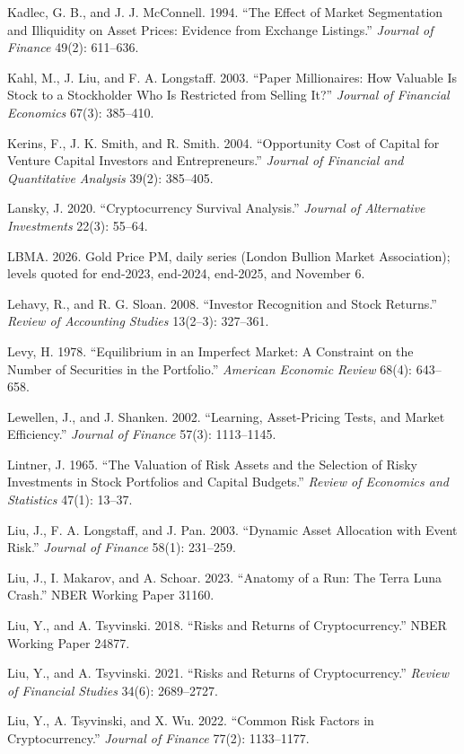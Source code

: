 \documentclass[11pt]{article}
\begin{document}
\begin{list}{}{\setlength{\itemindent}{-1.5em}\setlength{\leftmargin}{1.5em}\setlength{\itemsep}{2pt}\setlength{\parsep}{0pt}}
\item Kadlec, G. B., and J. J. McConnell. 1994. ``The Effect of Market Segmentation and Illiquidity on Asset Prices: Evidence from Exchange Listings.'' \emph{Journal of Finance} 49(2): 611--636.
\item Kahl, M., J. Liu, and F. A. Longstaff. 2003. ``Paper Millionaires: How Valuable Is Stock to a Stockholder Who Is Restricted from Selling It?'' \emph{Journal of Financial Economics} 67(3): 385--410.
\item Kerins, F., J. K. Smith, and R. Smith. 2004. ``Opportunity Cost of Capital for Venture Capital Investors and Entrepreneurs.'' \emph{Journal of Financial and Quantitative Analysis} 39(2): 385--405.
\item Lansky, J. 2020. ``Cryptocurrency Survival Analysis.'' \emph{Journal of Alternative Investments} 22(3): 55--64.
\item LBMA. 2026. Gold Price PM, daily series (London Bullion Market Association); levels quoted for end-2023, end-2024, end-2025, and November 6.
\item Lehavy, R., and R. G. Sloan. 2008. ``Investor Recognition and Stock Returns.'' \emph{Review of Accounting Studies} 13(2--3): 327--361.
\item Levy, H. 1978. ``Equilibrium in an Imperfect Market: A Constraint on the Number of Securities in the Portfolio.'' \emph{American Economic Review} 68(4): 643--658.
\item Lewellen, J., and J. Shanken. 2002. ``Learning, Asset-Pricing Tests, and Market Efficiency.'' \emph{Journal of Finance} 57(3): 1113--1145.
\item Lintner, J. 1965. ``The Valuation of Risk Assets and the Selection of Risky Investments in Stock Portfolios and Capital Budgets.'' \emph{Review of Economics and Statistics} 47(1): 13--37.
\item Liu, J., F. A. Longstaff, and J. Pan. 2003. ``Dynamic Asset Allocation with Event Risk.'' \emph{Journal of Finance} 58(1): 231--259.
\item Liu, J., I. Makarov, and A. Schoar. 2023. ``Anatomy of a Run: The Terra Luna Crash.'' NBER Working Paper 31160.
\item Liu, Y., and A. Tsyvinski. 2018. ``Risks and Returns of Cryptocurrency.'' NBER Working Paper 24877.
\item Liu, Y., and A. Tsyvinski. 2021. ``Risks and Returns of Cryptocurrency.'' \emph{Review of Financial Studies} 34(6): 2689--2727.
\item Liu, Y., A. Tsyvinski, and X. Wu. 2022. ``Common Risk Factors in Cryptocurrency.'' \emph{Journal of Finance} 77(2): 1133--1177.

\end{list}
\end{document}
